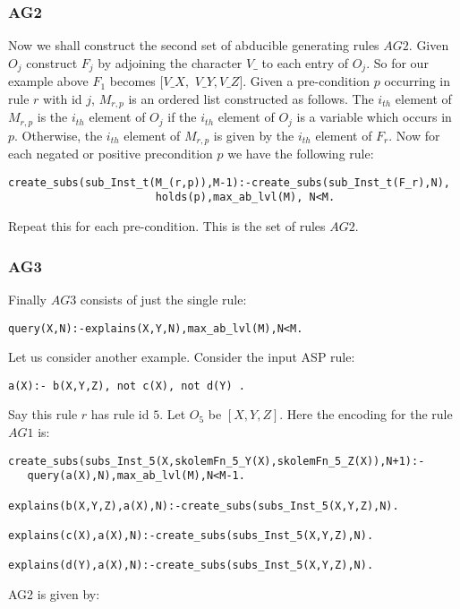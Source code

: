 \subsubsection{AG2}
Now we shall construct the second set
of abducible generating rules $AG2$. Given $O_{j}$ construct $F_{j}$ by adjoining the character
$V\_$ to each entry of $O_{j}$. So for our example above $F_{1}$ becomes
$[V\_X,$ $V\_Y,V\_Z]$. Given a pre-condition $p$
occurring in rule $r$ with id $j$, $M_{r,p}$ is an ordered list constructed as follows. The
$i_{th}$ element of $M_{r,p}$ is the $i_{th}$ element of $O_{j}$ if the
$i_{th}$ element of $O_{j}$ is a variable which occurs in $p$. Otherwise, the
$i_{th}$ element of $M_{r,p}$ is given by the $i_{th}$ element of $F_{r}$. Now
for each negated or positive precondition $p$ we have the following rule:
\begin{lstlisting}[frame=none]
 create_subs(sub_Inst_t(M_(r,p)),M-1):-create_subs(sub_Inst_t(F_r),N),
                       holds(p),max_ab_lvl(M), N<M.   
\end{lstlisting}
Repeat this for each pre-condition. This is the set of rules $AG2$.


\subsubsection{AG3}
Finally $AG3$ consists of just the single rule:
\begin{lstlisting}[frame=none]
query(X,N):-explains(X,Y,N),max_ab_lvl(M),N<M.
\end{lstlisting}
Let us consider another example.
Consider the input ASP rule:
\begin{lstlisting}[frame=none]
a(X):- b(X,Y,Z), not c(X), not d(Y) .    
\end{lstlisting}
Say this rule $r$ has rule id $5$. 
Let $O_{5}$ be $[X,Y,Z]$. Here the encoding for the rule $AG1$ is:
\begin{lstlisting}[frame=none]
create_subs(subs_Inst_5(X,skolemFn_5_Y(X),skolemFn_5_Z(X)),N+1):-
   query(a(X),N),max_ab_lvl(M),N<M-1.

explains(b(X,Y,Z),a(X),N):-create_subs(subs_Inst_5(X,Y,Z),N).

explains(c(X),a(X),N):-create_subs(subs_Inst_5(X,Y,Z),N).

explains(d(Y),a(X),N):-create_subs(subs_Inst_5(X,Y,Z),N).
\end{lstlisting}
AG2 is given by:

